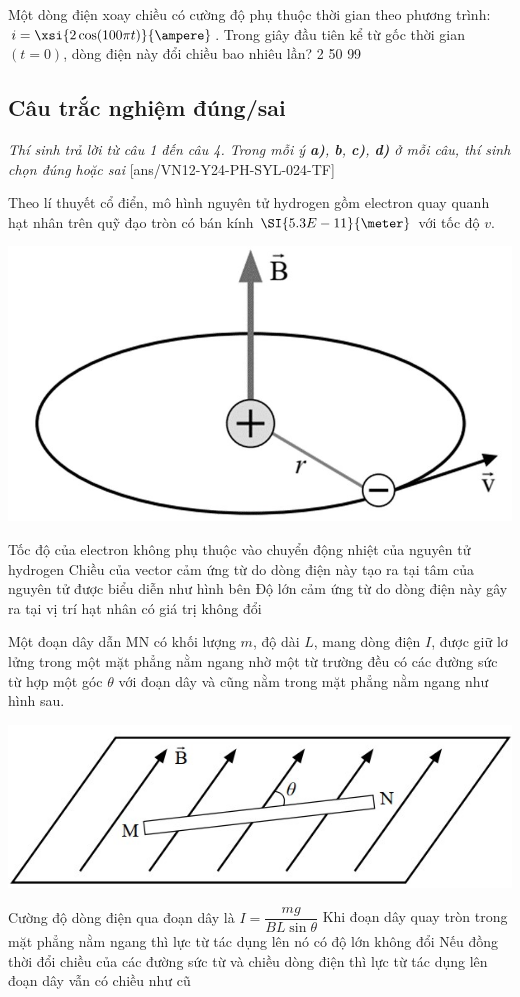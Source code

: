 \begin{ex}
	Một dòng điện xoay chiều có cường độ phụ thuộc thời gian theo phương trình: $i=\xsi{2 \cos (100 \pi t)}{\ampere}$. Trong giây đầu tiên kể từ gốc thời gian $(t=0)$, dòng điện này đổi chiều bao nhiêu lần?
	\choice
	{2}
	{50}
	{}
	{99}
	\loigiai{}
\end{ex}

\subsection{Câu trắc nghiệm đúng/sai}
\textit{Thí sinh trả lời từ câu 1 đến câu 4. Trong mỗi ý \textbf{a)}, \textbf{b}, \textbf{c)}, \textbf{d)} ở mỗi câu, thí sinh chọn đúng hoặc sai}
\setcounter{ex}{0}
[ans/VN12-Y24-PH-SYL-024-TF]
\begin{ex}
	Theo lí thuyết cổ điển, mô hình nguyên tử hydrogen gồm electron quay quanh hạt nhân trên quỹ đạo tròn có bán kính $\SI{5.3E-11}{\meter}$ với tốc độ $v$.	
	\begin{center}
		\includegraphics[width=0.3\linewidth]{figs/VN12-Y24-PH-SYL-025P-10}
	\end{center}
	{\True Tốc độ của electron không phụ thuộc vào chuyển động nhiệt của nguyên tử hydrogen}
	{Chiều của vector cảm ứng từ do dòng điện này tạo ra tại tâm của nguyên tử được biểu diễn như hình bên}
	{\True Độ lớn cảm ứng từ do dòng điện này gây ra tại vị trí hạt nhân có giá trị không đổi}
	\loigiai{}
\end{ex}
\begin{ex}
	Một đoạn dây dẫn MN có khối lượng $m$, độ dài $L$, mang dòng điện $I$, được giữ lơ lửng trong một mặt phẳng nằm ngang nhờ một từ trường đều có các đường sức từ hợp một góc $\theta$ với đoạn dây và cũng nằm trong mặt phẳng nằm ngang như hình sau.
	\begin{center}
		\includegraphics[width=0.4\linewidth]{figs/VN12-Y24-PH-SYL-025P-11}
	\end{center}	
	{\True Cường độ dòng điện qua đoạn dây là $I=\dfrac{m g}{B L \sin \theta}$}
	{Khi đoạn dây quay tròn trong mặt phẳng nằm ngang thì lực từ tác dụng lên nó có độ lớn không đổi}
	{\True Nếu đồng thời đổi chiều của các đường sức từ và chiều dòng điện thì lực từ tác dụng lên đoạn dây vẫn có chiều như cũ}
	\loigiai{}
\end{ex}
